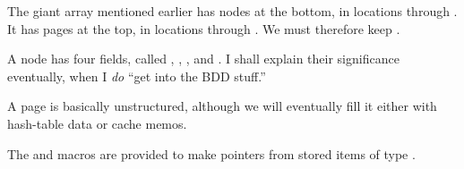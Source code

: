 The giant  array mentioned earlier has nodes at the bottom,
in locations  through . It has pages at the
top,
in locations  through . We must
therefore keep
.

A node has four fields, called , , , and %
.
I shall explain their significance eventually,
when I {\it do\/} ``get into the BDD stuff.''

A page is basically unstructured, although we will eventually fill
it either with hash-table data or cache memos.

The  and  macros are provided to make pointers
from stored items of type .

